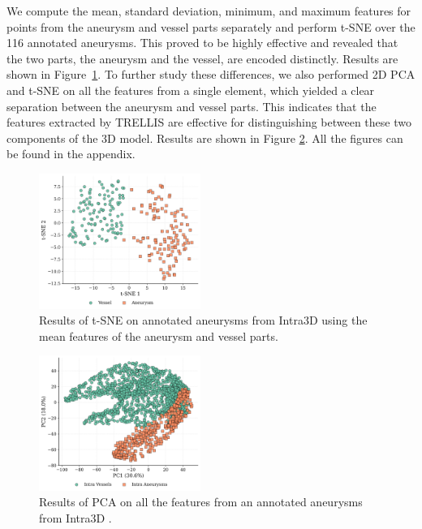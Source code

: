 \documentclass[%
 reprint,
 amsmath,amssymb,
 aps,
 floatfix,
 nofootinbib,
]{revtex4-2}
\begin{document}
We compute the mean, standard deviation, minimum, and maximum features for points from the aneurysm and vessel parts separately and perform t-SNE over the 116 annotated aneurysms. This proved to be highly effective and revealed that the two parts, the aneurysm and the vessel, are encoded distinctly. Results are shown in Figure~\ref{fig:aneu_seg}. To further study these differences, we also performed 2D PCA and t-SNE on all the features from a single element, which yielded a clear separation between the aneurysm and vessel parts. This indicates that the features extracted by TRELLIS \citep{xiang2024structured} are effective for distinguishing between these two components of the 3D model. Results are shown in Figure \ref{fig:aneu_seg_2}. All the figures can be found in the appendix.


\begin{figure}[h!]
  \centering
  \includegraphics[width=0.47\textwidth]{t-sne_global_mean.png}
  \caption{Results of t-SNE on annotated aneurysms from Intra3D \citep{yang2020intra} using the mean features of the aneurysm and vessel parts.}
  \label{fig:aneu_seg}
\end{figure}

\begin{figure}[h!]
  \centering
  \includegraphics[width=0.47\textwidth]{pca_intra_features.png}
  \caption{Results of PCA on all the features from an annotated aneurysms from Intra3D \citep{yang2020intra}.}
  \label{fig:aneu_seg_2}
\end{figure}
\end{document}
